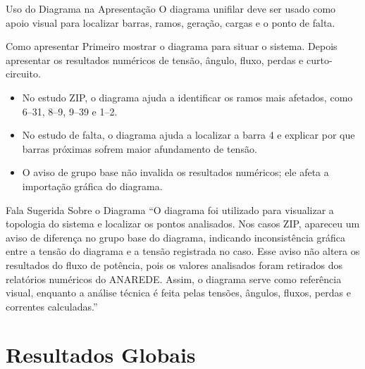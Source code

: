 \documentclass[aspectratio=169,11pt]{beamer}
\begin{document}
\begin{frame}{Uso do Diagrama na Apresentação}
  O diagrama unifilar deve ser usado como apoio visual para localizar barras, ramos, geração, cargas e o ponto de falta.

  \begin{block}{Como apresentar}
    Primeiro mostrar o diagrama para situar o sistema. Depois apresentar os resultados numéricos de tensão, ângulo, fluxo, perdas e curto-circuito.
  \end{block}

  \begin{itemize}
    \item No estudo ZIP, o diagrama ajuda a identificar os ramos mais afetados, como 6--31, 8--9, 9--39 e 1--2.
    \item No estudo de falta, o diagrama ajuda a localizar a barra 4 e explicar por que barras próximas sofrem maior afundamento de tensão.
    \item O aviso de grupo base não invalida os resultados numéricos; ele afeta a importação gráfica do diagrama.
  \end{itemize}
\end{frame}

\begin{frame}{Fala Sugerida Sobre o Diagrama}
  \small
  ``O diagrama foi utilizado para visualizar a topologia do sistema e localizar os pontos analisados. Nos casos ZIP, apareceu um aviso de diferença no grupo base do diagrama, indicando inconsistência gráfica entre a tensão do diagrama e a tensão registrada no caso. Esse aviso não altera os resultados do fluxo de potência, pois os valores analisados foram retirados dos relatórios numéricos do ANAREDE. Assim, o diagrama serve como referência visual, enquanto a análise técnica é feita pelas tensões, ângulos, fluxos, perdas e correntes calculadas.''
\end{frame}

\section{Resultados Globais}
\end{document}
